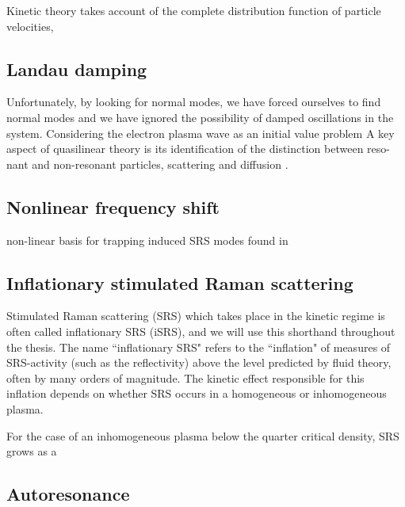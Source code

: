 Kinetic theory takes account of the complete distribution function of particle velocities, 

\subsection{Landau damping}


Unfortunately, by looking for normal modes, we have forced ourselves to find normal modes and we have ignored the possibility of damped oscillations in the system. Considering the electron plasma wave as an initial value problem 
A key aspect of quasilinear theory is its identification of the distinction between reso-
nant and non-resonant particles, scattering and diffusion \citep{Sagdeev2018}.

\subsection{Nonlinear frequency shift}
non-linear basis for trapping induced SRS modes found in \cite{Rose2001}


\subsection{Inflationary stimulated Raman scattering}

Stimulated Raman scattering (\acrshort{SRS}) which takes place in the kinetic regime is often called inflationary SRS (\acrshort{iSRS}), and we will use this shorthand throughout the thesis. The name ``inflationary SRS" refers to the ``inflation" of measures of SRS-activity (such as the reflectivity) above the level predicted by fluid theory, often by many orders of magnitude. The kinetic effect responsible for this inflation depends on whether SRS occurs in a homogeneous or inhomogeneous plasma.

For the case of an inhomogeneous plasma below the quarter critical density, SRS grows as a 




\subsection{Autoresonance}

